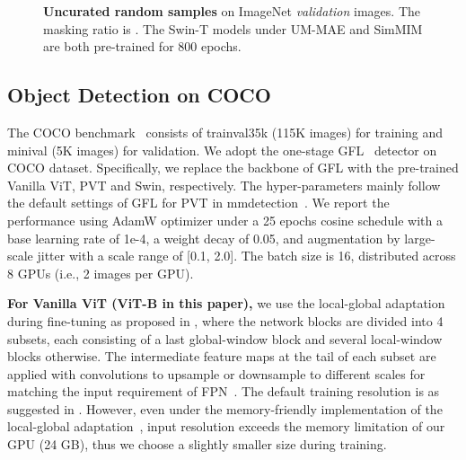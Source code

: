 \documentclass{article}
\begin{document}
\begin{figure}[t]
	\vspace{0pt}
	\begin{center}
		\setlength{\fboxrule}{0pt}
	\end{center}	
	\vspace{-14pt}
	\caption{\textbf{Uncurated random samples} on ImageNet \textit{validation} images. The masking ratio is . The Swin-T models under UM-MAE and SimMIM are both pre-trained for 800 epochs.
	}
	\label{fig_sm_more_visual_cropped}
	\vspace{-4pt}
\end{figure}

\subsection{Object Detection on COCO}
The COCO benchmark~\cite{lin2014microsoft} consists of  trainval35k (115K images) for training and minival (5K images) for validation. We adopt the one-stage GFL~\cite{li2020generalized} detector on COCO dataset. Specifically, we replace the backbone of GFL with the pre-trained Vanilla ViT, PVT and Swin, respectively. The hyper-parameters mainly follow the default settings of GFL for PVT in mmdetection~\cite{chen2019mmdetection}. We report the performance using AdamW optimizer under a 25 epochs cosine schedule with a base learning rate of 1e-4, a weight decay of 0.05, and augmentation by large-scale jitter with a scale range of [0.1, 2.0]. The batch size is 16, distributed across 8 GPUs (i.e., 2 images per GPU).

\textbf{For Vanilla ViT (ViT-B in this paper),} we use the local-global adaptation during fine-tuning as proposed in \cite{li2021benchmarking}, where the network blocks are divided into 4 subsets, each consisting of a last global-window block and several local-window blocks otherwise. The intermediate feature maps at the tail of each subset are applied with convolutions to upsample or downsample to different scales for matching the input requirement of FPN~\cite{lin2017feature}. The default training resolution is  as suggested in \cite{li2021benchmarking,li2022exploring}. However, even under the memory-friendly implementation of the local-global adaptation~\cite{li2021benchmarking},  input resolution exceeds the memory limitation of our GPU (24 GB), thus we choose a slightly smaller size  during training. 
\end{document}
